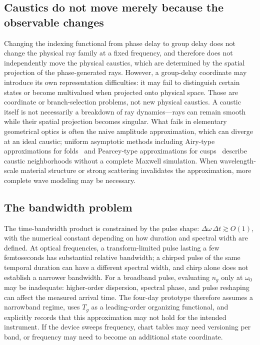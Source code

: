\documentclass[11pt]{article}
\begin{document}
\subsection{Caustics do not move merely because the observable changes}

Changing the indexing functional from phase delay to group delay does not change the
physical ray family at a fixed frequency, and therefore does not independently move the
physical caustics, which are determined by the spatial projection of the
phase-generated rays. However, a group-delay coordinate may introduce its own
representation difficulties: it may fail to distinguish certain states or become
multivalued when projected onto physical space. Those are coordinate or branch-selection
problems, not new physical caustics. A caustic itself is not necessarily a breakdown of
ray dynamics---rays can remain smooth while their spatial projection becomes
singular. What fails in elementary geometrical optics is often the naive amplitude
approximation, which can diverge at an ideal caustic; uniform asymptotic methods
including Airy-type approximations for folds~\cite{airy1841} and Pearcey-type
approximations for cusps~\cite{pearcey1946,berry1980}
describe caustic neighborhoods without a complete Maxwell simulation. When
wavelength-scale material structure or strong scattering invalidates the approximation,
more complete wave modeling may be necessary.

\subsection{The bandwidth problem}

The time-bandwidth product is constrained by the pulse shape:
$\Delta\omega\,\Delta t \gtrsim O(1)$, with the numerical constant depending on how
duration and spectral width are defined. At optical frequencies, a transform-limited
pulse lasting a few femtoseconds has substantial relative bandwidth; a chirped pulse of
the same temporal duration can have a different spectral width, and chirp alone does not
establish a narrower bandwidth. For a broadband pulse, evaluating $n_g$ only at
$\omega_0$ may be inadequate: higher-order dispersion, spectral phase, and pulse
reshaping can affect the measured arrival time. The four-day prototype therefore assumes
a narrowband regime, uses $T_g$ as a leading-order organizing functional, and explicitly
records that this approximation may not hold for the intended instrument. If the device
sweeps frequency, chart tables may need versioning per band, or frequency may need to
become an additional state coordinate.
\end{document}
